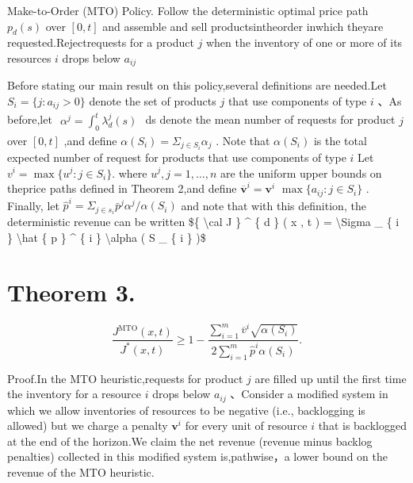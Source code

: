 Make-to-Order (MTO) Policy. Follow the deterministic optimal price path
\(p _ { d } ( s )\) over \([ 0 , t ]\) and assemble and sell
productsintheorder inwhich theyare requested.Rejectrequests for a
product \(j\) when the inventory of one or more of its resources \(i\)
drops below \(a _ { i j }\)

Before stating our main result on this policy,several definitions are
needed.Let \(S _ { i } = \{ j \colon a _ { i j } > 0 \}\) denote the set
of products \(j\) that use components of type \(i\) 、As before,let
\(\begin{array} { r } { \alpha ^ { j } = \int _ { 0 } ^ { t } \lambda _ { d } ^ { j } ( s ) } \end{array}\)
ds denote the mean number of requests for product \(j\) over
\([ 0 , t ]\) ,and define
\(\alpha ( S _ { i } ) = \Sigma _ { j \in S _ { i } } \alpha _ { j }\) .
Note that \(\alpha ( S _ { i } )\) is the total expected number of
request for products that use components of type \(i\) Let
\(v ^ { i } = \operatorname* { m a x } \{ u ^ { j } \colon j \in S _ { i } \} .\)
where \(u ^ { j } , j = 1 , \ldots , n\) are the uniform upper bounds on
theprice paths defined in Theorem 2,and define
\(\overline { { \boldsymbol { v } } } ^ { i } = \boldsymbol { v } ^ { i }\)
\(\operatorname* { m a x } \{ a _ { i j } \colon j \in S _ { i } \}\) .
Finally, let
\(\hat { p } ^ { i } = \Sigma _ { j \in { s _ { i } } } \bar { p } ^ { j } \alpha ^ { j } / \alpha ( S _ { i } )\)
and note that with this definition, the deterministic revenue can be
written {\$\{ \textbackslash cal J \} \^{} \{ d \} ( x , t ) =
\textbackslash Sigma \_ \{ i \} \textbackslash hat \{ p \} \^{} \{ i \}
\textbackslash alpha ( S \_ \{ i \} )\$}

\section{Theorem 3.}\label{theorem-3.}

\[
\frac { J ^ { \mathrm { M T O } } ( x , t ) } { J ^ { * } ( x , t ) } \geqslant 1 - \frac { \sum _ { i = 1 } ^ { m } \overline { { { v } } } ^ { i } \sqrt { \alpha ( S _ { i } ) } } { 2 \sum _ { i = 1 } ^ { m } \hat { p } ^ { i } \alpha ( S _ { i } ) } .
\]

Proof.In the MTO heuristic,requests for product \(j\) are filled up
until the first time the inventory for a resource \(i\) drops below
\(a _ { i j }\) 、Consider a modified system in which we allow
inventories of resources to be negative (i.e., backlogging is allowed)
but we charge a penalty \(\boldsymbol { v } ^ { i }\) for every unit of
resource \(i\) that is backlogged at the end of the horizon.We claim the
net revenue (revenue minus backlog penalties) collected in this modified
system is,pathwise，a lower bound on the revenue of the MTO heuristic.

